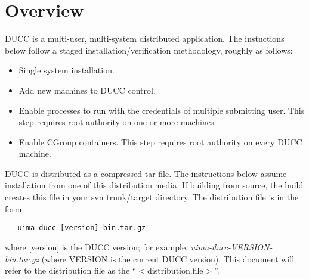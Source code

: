 % 
% 
% 
% 
\section{Overview}

DUCC is a multi-user, multi-system distributed application.
The instuctions below follow a staged installation/verification methodology,
roughly as follows:

\begin{itemize}
    \item Single system installation.
      
    \item Add new machines to DUCC control.
      
    \item Enable processes to run with the credentials of multiple submitting user.
      This step requires root authority on one or more machines.
      
    \item Enable CGroup containers. This step requires root authority on every DUCC machine.
\end{itemize}

DUCC is distributed as a compressed tar file.  The instructions below assume installation from one
of this distribution media.  If building from source, the build creates this file in your svn
trunk/target directory. The distribution file is in the form
\begin{verbatim}
   uima-ducc-[version]-bin.tar.gz
\end{verbatim}
where [version] is the DUCC version; for example, {\em uima-ducc-VERSION-bin.tar.gz} (where VERSION is the current DUCC version).  This document will refer to the distribution
file as the ``$<$distribution.file$>$''.

